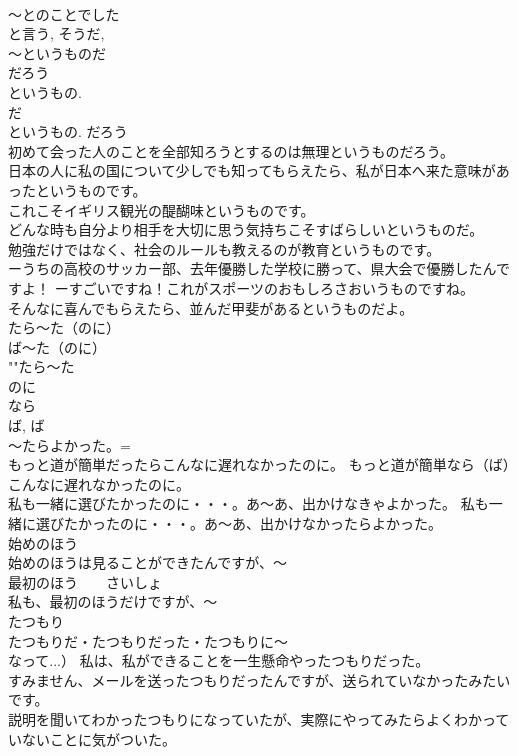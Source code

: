 \documentclass[8pt]{extreport}
\begin{document}
\begin{CJK}{UTF8}{min}
\\	～とのことでした 
\\	と言う, そうだ, 
\\	～というものだ 
\\	だろう 
\\	というもの. 
\\	だ 
\\	というもの. だろう 
\\	初めて会った人のことを全部知ろうとするのは無理というものだろう。 
\\	日本の人に私の国について少しでも知ってもらえたら、私が日本へ来た意味があったというものです。 
\\	これこそイギリス観光の醍醐味というものです。 
\\	どんな時も自分より相手を大切に思う気持ちこそすばらしいというものだ。 
\\	勉強だけではなく、社会のルールも教えるのが教育というものです。 
\\	ーうちの高校のサッカー部、去年優勝した学校に勝って、県大会で優勝したんですよ！ ーすごいですね！これがスポーツのおもしろさおいうものですね。 
\\	そんなに喜んでもらえたら、並んだ甲斐があるというものだよ。 
\\	たら～た（のに） 
\\	ば～た（のに）	
\\	""たら～た
\\	のに 
\\	なら
\\	ば, ば 
\\	～たらよかった。= 
\\	もっと道が簡単だったらこんなに遅れなかったのに。 もっと道が簡単なら（ば）こんなに遅れなかったのに。 
\\	私も一緒に選びたかったのに・・・。あ～あ、出かけなきゃよかった。 私も一緒に選びたかったのに・・・。あ～あ、出かけなかったらよかった。 
\\	始めのほう	
\\	始めのほうは見ることができたんですが、～ 
\\	最初のほう　　さいしょ 
\\	私も、最初のほうだけですが、～ 
\\	たつもり	
\\	たつもりだ・たつもりだった・たつもりに～
\\	なって...） 私は、私ができることを一生懸命やったつもりだった。 
\\	すみません、メールを送ったつもりだったんですが、送られていなかったみたいです。 
\\	説明を聞いてわかったつもりになっていたが、実際にやってみたらよくわかっていないことに気がついた。 

\end{CJK}
\end{document}
